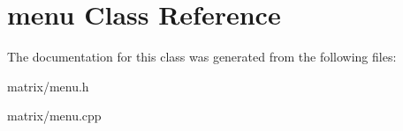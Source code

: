 \section{menu Class Reference}
\label{classmenu}


The documentation for this class was generated from the following files\+:\begin{DoxyCompactItemize}
\item 
matrix/menu.\+h\item 
matrix/menu.\+cpp\end{DoxyCompactItemize}
